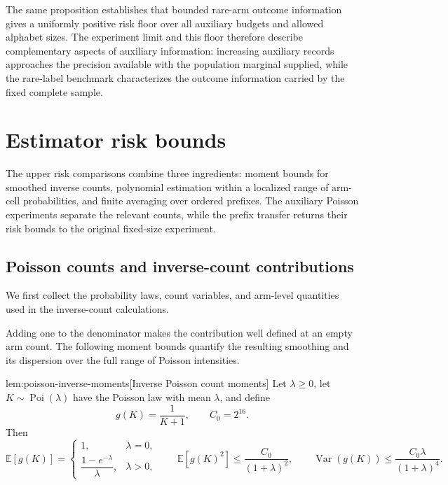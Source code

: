 \documentclass[11pt]{article}
\begin{document}
The same proposition establishes that bounded rare-arm outcome information gives a uniformly positive risk floor over all auxiliary budgets and allowed alphabet sizes. The experiment limit and this floor therefore describe complementary aspects of auxiliary information: increasing auxiliary records approaches the precision available with the population marginal supplied, while the rare-label benchmark characterizes the outcome information carried by the fixed complete sample.


\section{Estimator risk bounds}

The upper risk comparisons combine three ingredients: moment bounds for smoothed inverse counts, polynomial estimation within a localized range of arm-cell probabilities, and finite averaging over ordered prefixes. The auxiliary Poisson experiments separate the relevant counts, while the prefix transfer returns their risk bounds to the original fixed-size experiment.

\subsection{Poisson counts and inverse-count contributions}

We first collect the probability laws, count variables, and arm-level quantities used in the inverse-count calculations.



Adding one to the denominator makes the contribution well defined at an empty arm count. The following moment bounds quantify the resulting smoothing and its dispersion over the full range of Poisson intensities.

\begin{lemmav}{lem:poisson-inverse-moments}[Inverse Poisson count moments]
Let \(\lambda\ge 0\), let \(K\sim\operatorname{Poi}(\lambda)\) have the Poisson law with mean \(\lambda\), and define
\[
g(K)=\frac{1}{K+1},
\qquad C_0=2^{16}.
\]
Then
\[
\mathbb E[g(K)]
=
\begin{cases}
1,&\lambda=0,\\
\dfrac{1-e^{-\lambda}}{\lambda},&\lambda>0,
\end{cases}
\qquad
\mathbb E[g(K)^2]\le \frac{C_0}{(1+\lambda)^2},
\qquad
\operatorname{Var}(g(K))\le \frac{C_0\lambda}{(1+\lambda)^4}.
\]
\end{lemmav}
\end{document}
